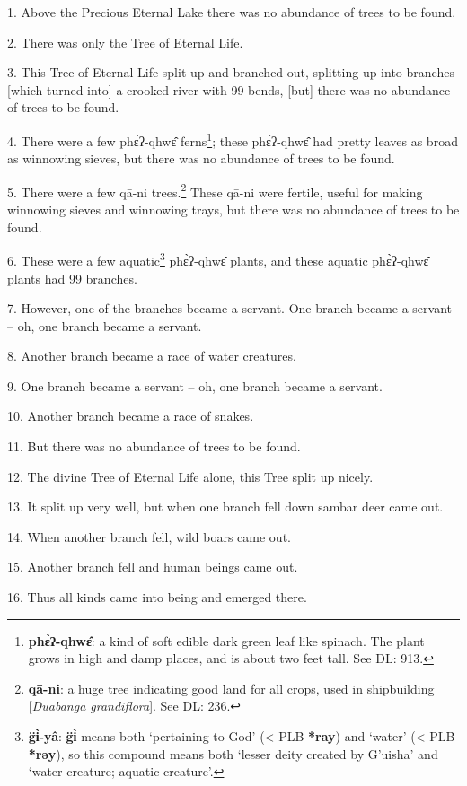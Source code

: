 \setcounter{footnote}{0}

1. Above the Precious Eternal Lake there was no abundance of trees to be found.

2. There was only the Tree of Eternal Life.

3. This Tree of Eternal Life split up and branched out, splitting up into branches
[which turned into] a crooked river with 99 bends, [but] there was no abundance
of trees to be found.

4. There were a few phɛ̀ʔ-qhwɛ̂ ferns\footnote{\textbf{phɛ̀ʔ-qhwɛ̂}: a kind of soft edible dark green leaf like spinach. The plant grows in high and damp places, and is about two feet tall. See DL: 913.}; these phɛ̀ʔ-qhwɛ̂ had pretty
leaves as broad as winnowing sieves, but there was no abundance of trees to be
found.

5. There were a few qā-ni trees.\footnote{\textbf{qā-ni}: a huge tree indicating good land for all crops, used in shipbuilding [\textit{Duabanga grandiflora}]. See DL: 236.} These qā-ni were fertile, useful for making
winnowing sieves and winnowing trays, but there was no abundance of trees to be
found.

6. These were a few aquatic\footnote{\textbf{g̈ɨ̀-yâ}: \textbf{g̈ɨ̀} means both `pertaining to God' (< PLB \textbf{*ray}) and `water' (< PLB \textbf{*rəy}), so this compound means both `lesser deity created by G'uisha' and `water creature; aquatic creature'.} phɛ̀ʔ-qhwɛ̂ plants, and these aquatic phɛ̀ʔ-qhwɛ̂
plants had 99 branches.

7. However, one of the branches became a servant. One branch became a servant --
oh, one branch became a servant.

8. Another branch became a race of water creatures.

9. One branch became a servant -- oh, one branch became a servant.

10. Another branch became a race of snakes.

11. But there was no abundance of trees to be found.

12. The divine Tree of Eternal Life alone, this Tree split up nicely.

13. It split up very well, but when one branch fell down sambar deer came out.

14. When another branch fell, wild boars came out.

15. Another branch fell and human beings came out.

16. Thus all kinds came into being and emerged there.

